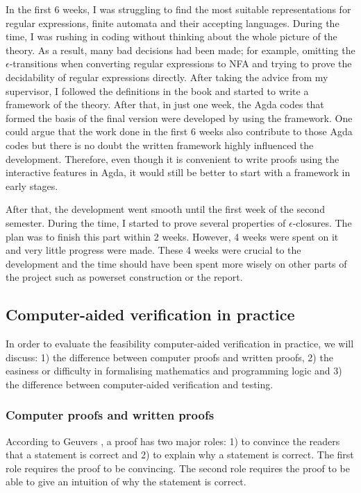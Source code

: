 \par In the first 6 weeks, I was struggling to find
the most suitable representations for regular expressions, finite
automata and their accepting languages. During the time, I was
rushing in coding without thinking about the whole picture of
the theory. As a result, many bad decisions had been made; for example, omitting the
\(\epsilon\)-transitions when converting regular expressions to NFA and trying to prove
the decidability of regular expressions directly. After taking the
advice from my supervisor, I followed the definitions in the
book \cite{aho1972} and started to write a framework of the
theory. After that, in just one week, the Agda
codes that formed the basis of the final version were developed by
using the framework. One could argue that the work
done in the first 6 weeks also contribute to those Agda codes but
there is no doubt the written framework highly influenced the
development. Therefore, even though it is convenient to write proofs
using the interactive features in Agda,
it would still be better to start with a framework in early stages. 

\par After that, the development went smooth until the first week of
the second semester. During the time, I started to prove several
properties of \(\epsilon\)-closures. The plan was to finish this part
within 2 weeks. However, 4 weeks were spent on it and very little
progress were made. These 4 weeks were crucial to the development and
the time should have been spent more wisely on other parts of the
project such as powerset construction or the report. 


\subsection{Computer-aided verification in practice}
\par In order to evaluate the feasibility computer-aided verification in
practice, we will discuss: 1) the difference between computer proofs and written proofs, 2) the easiness or
difficulty in formalising mathematics and programming logic and 3) the
difference between computer-aided verification and testing. 


\subsubsection{Computer proofs and written proofs}
\par According to Geuvers \cite{geuvers2009}, a proof has two major roles: 1)
to convince the readers that a statement is correct and 2) to explain
why a statement is correct. The first role requires the proof to be
convincing. The second role requires the proof to be able to give an
intuition of why the statement is correct. 

